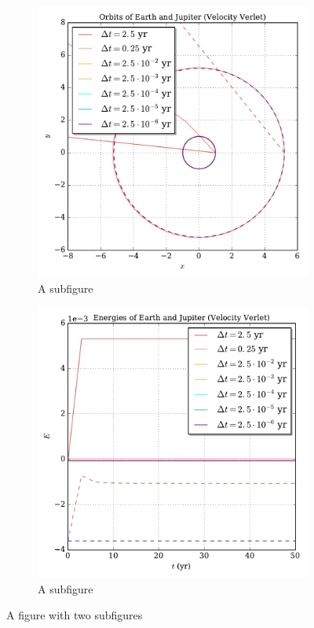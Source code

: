 \documentclass[prb,aps,twocolumn,showpacs,10pt]{revtex4-1}
\begin{document}
\begin{figure}
\centering
\begin{subfigure}{.5\textwidth}
  \centering
  \includegraphics[width=\linewidth]{trinary_fixed_vv_orbit.pdf}
  \caption{A subfigure}
  \label{fig:sub1}
\end{subfigure}%
\begin{subfigure}{.5\textwidth}
  \centering
  \includegraphics[width=\linewidth]{trinary_fixed_vv_energy.pdf}
  \caption{A subfigure}
  \label{fig:sub2}
\end{subfigure}
\caption{A figure with two subfigures}
\label{fig:test}
\end{figure}
\end{document}
